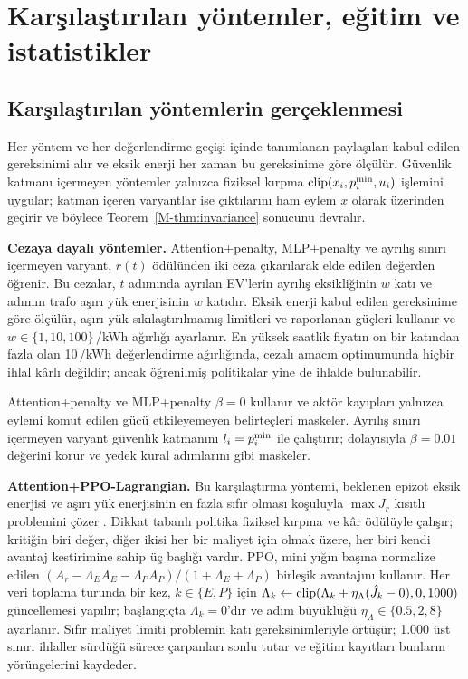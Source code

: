 \section{Karşılaştırılan yöntemler, eğitim ve istatistikler}\label{sec:training-supp}

\subsection{Karşılaştırılan yöntemlerin gerçeklenmesi}\label{app:baselines}

Her yöntem ve her değerlendirme geçişi  içinde tanımlanan paylaşılan kabul edilen gereksinimi alır ve eksik enerji her zaman bu gereksinime göre ölçülür.
Güvenlik katmanı içermeyen yöntemler yalnızca fiziksel kırpma $\operatorname{clip}(x_i,p^{\min}_i,u_i)$ işlemini uygular; katman içeren varyantlar ise çıktılarını ham eylem $x$ olarak  üzerinden geçirir ve böylece Teorem~\ref{M-thm:invariance} sonucunu devralır.

\textbf{Cezaya dayalı yöntemler.}
Attention+penalty, MLP+penalty ve ayrılış sınırı içermeyen varyant, $r(t)$ ödülünden iki ceza çıkarılarak elde edilen değerden öğrenir.
Bu cezalar, $t$ adımında ayrılan EV'lerin ayrılış eksikliğinin $w$ katı ve adımın trafo aşırı yük enerjisinin $w$ katıdır.
Eksik enerji kabul edilen gereksinime göre ölçülür, aşırı yük sıkılaştırılmamış limitleri ve raporlanan güçleri kullanır ve $w\in\{1,10,100\}$\,\texteuro/kWh ağırlığı ayarlanır.
En yüksek saatlik fiyatın on bir katından fazla olan 10\,\texteuro/kWh değerlendirme ağırlığında, cezalı amacın optimumunda hiçbir ihlal kârlı değildir; ancak öğrenilmiş politikalar yine de ihlalde bulunabilir.

Attention+penalty ve MLP+penalty $\beta=0$ kullanır ve aktör kayıpları yalnızca eylemi komut edilen gücü etkileyemeyen belirteçleri maskeler.
Ayrılış sınırı içermeyen varyant güvenlik katmanını $l_i=p^{\min}_i$ ile çalıştırır; dolayısıyla $\beta=0.01$ değerini korur ve yedek kural adımlarını \method{} gibi maskeler.

\textbf{Attention+PPO-Lagrangian.}
Bu karşılaştırma yöntemi, beklenen epizot eksik enerjisi ve aşırı yük enerjisinin en fazla sıfır olması koşuluyla $\max J_r$ kısıtlı problemini çözer \cite{altman2021constrained,tessler2018reward}.
Dikkat tabanlı politika fiziksel kırpma ve kâr ödülüyle çalışır; kritiğin biri değer, diğer ikisi her bir maliyet için olmak üzere, her biri kendi avantaj kestirimine sahip üç başlığı vardır.
PPO, mini yığın başına normalize edilen $(A_r-\Lambda_EA_E-\Lambda_PA_P)/(1+\Lambda_E+\Lambda_P)$ birleşik avantajını kullanır.
Her veri toplama turunda bir kez, $k\in\{E,P\}$ için $\Lambda_k\gets\operatorname{clip}(\Lambda_k+\eta_\Lambda(\hat J_k-0),0,1000)$ güncellemesi yapılır; başlangıçta $\Lambda_k=0$'dır ve adım büyüklüğü $\eta_\Lambda\in\{0.5,2,8\}$ ayarlanır.
Sıfır maliyet limiti problemin katı gereksinimleriyle örtüşür; 1.000 üst sınırı ihlaller sürdüğü sürece çarpanları sonlu tutar ve eğitim kayıtları bunların yörüngelerini kaydeder.

